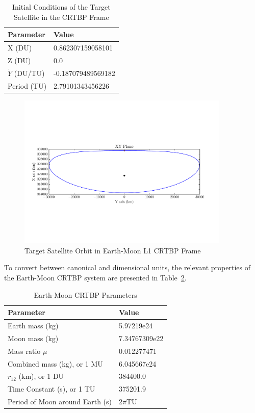 \documentclass[letterpaper, preprint, paper,11pt]{AAS}	%
\begin{document}
\begin{table}[htbp] 
	\fontsize{10}{10}\selectfont
	\caption{Initial Conditions of the Target Satellite in the CRTBP Frame}
	\label{tab:IC_1}
	\centering
	\begin{tabular}{l l}
		\hline 
		Parameter   & Value \\
		\hline 
		X (DU)                & 0.862307159058101 \\
		Z (DU)                & 0.0 \\
		\(\dot{Y}\) (DU/TU)      & -0.187079489569182 \\
		Period (TU)           & 2.79101343456226 \\
		\hline 
	\end{tabular}
\end{table}

\begin{figure}[htb]
	\begin{center}
		\includegraphics[width=0.9\textwidth]{Target_Full_Orbit_1}
		\caption{Target Satellite Orbit in Earth-Moon L1 CRTBP Frame}
		\label{fig:FullOrbit_1}
	\end{center}
\end{figure}

To convert between canonical and dimensional units, the relevant properties of the Earth-Moon CRTBP system are presented in Table~\ref{tab:Environment_1}.   

\begin{table}[htbp] 
	\fontsize{10}{10}\selectfont
	\caption{Earth-Moon CRTBP Parameters}
	\label{tab:Environment_1}
	\centering
	\begin{tabular}{l l}
		\hline
		Parameter   & Value \\
		\hline
		Earth mass (kg) & 5.97219e24 \\
		Moon mass (kg) & 7.34767309e22 \\
		Mass ratio \(\mu\)      & 0.012277471 \\
		Combined mass (kg), or 1 MU & 6.045667e24 \\
		\(r_{12}\) (km), or 1 DU & 384400.0 \\
		Time Constant (s), or 1 TU & 375201.9 \\
		Period of Moon around Earth (s) & 2\(\pi\)TU \\
		\hline
	\end{tabular}
\end{table}
\end{document}
